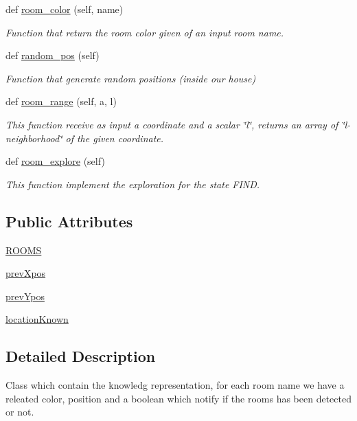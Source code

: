 \begin{DoxyCompactItemize}
def \hyperlink{classknowledgeRep_1_1Rooms_a41f6960d862a174fce8200ea1c7e003f}{room\+\_\+color} (self, name)
\begin{DoxyCompactList}\small\item\em Function that return the room color given of an input room name. \end{DoxyCompactList}\item 
def \hyperlink{classknowledgeRep_1_1Rooms_ae666c5c43dcaa315e41d7e8de7ae88a2}{random\+\_\+pos} (self)
\begin{DoxyCompactList}\small\item\em Function that generate random positions (inside our house) \end{DoxyCompactList}\item 
def \hyperlink{classknowledgeRep_1_1Rooms_a68eb5ab6fe7ee4edb42c499c14a915c0}{room\+\_\+range} (self, a, l)
\begin{DoxyCompactList}\small\item\em This function receive as input a coordinate and a scalar \char`\"{}l\char`\"{}, returns an array of \char`\"{}l-\/neighborhood\char`\"{} of the given coordinate. \end{DoxyCompactList}\item 
def \hyperlink{classknowledgeRep_1_1Rooms_a01836676d94fb144206866604cd089c6}{room\+\_\+explore} (self)
\begin{DoxyCompactList}\small\item\em This function implement the exploration for the state F\+I\+ND. \end{DoxyCompactList}\end{DoxyCompactItemize}
\subsection*{Public Attributes}
\begin{DoxyCompactItemize}
\item 
\hyperlink{classknowledgeRep_1_1Rooms_ae173d3ce96883c1e1cbcd3c67e045605}{R\+O\+O\+MS}
\item 
\hyperlink{classknowledgeRep_1_1Rooms_a41d3fe644e24332f8d5ce1ea1fd3d036}{prev\+Xpos}
\item 
\hyperlink{classknowledgeRep_1_1Rooms_abca079e9384306484df7407762e2c1cc}{prev\+Ypos}
\item 
\hyperlink{classknowledgeRep_1_1Rooms_ab43e8f7de2083bf7da36585822931688}{location\+Known}
\end{DoxyCompactItemize}


\subsection{Detailed Description}
Class which contain the knowledg representation, for each room name we have a releated color, position and a boolean which notify if the rooms has been detected or not. 



